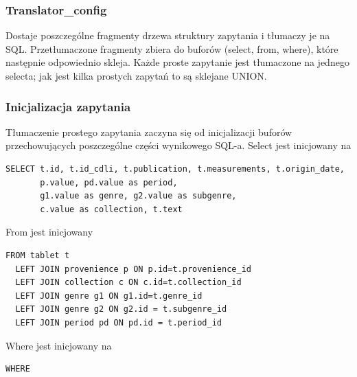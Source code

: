 \documentclass{pracamgr}
\begin{document}
 

\subsubsection{Translator\_config}
Dostaje poszczególne fragmenty drzewa struktury zapytania i tłumaczy je na SQL. Przetłumaczone fragmenty zbiera do buforów (select, from, where), które następnie odpowiednio skleja.
Każde proste zapytanie jest tłumaczone na jednego selecta; jak jest kilka prostych zapytań to są sklejane UNION.

\subsubsection{Inicjalizacja zapytania}
Tłumaczenie prostego zapytania zaczyna się od inicjalizacji buforów przechowujących poszczególne części wynikowego SQL-a.
Select jest inicjowany na 
\begin{verbatim}
SELECT t.id, t.id_cdli, t.publication, t.measurements, t.origin_date, 
       p.value, pd.value as period,
       g1.value as genre, g2.value as subgenre, 
       c.value as collection, t.text
\end{verbatim}
From jest inicjowany
\begin{verbatim}
FROM tablet t
  LEFT JOIN provenience p ON p.id=t.provenience_id
  LEFT JOIN collection c ON c.id=t.collection_id
  LEFT JOIN genre g1 ON g1.id=t.genre_id
  LEFT JOIN genre g2 ON g2.id = t.subgenre_id
  LEFT JOIN period pd ON pd.id = t.period_id
\end{verbatim}
Where jest inicjowany na
\begin{verbatim}
WHERE
\end{verbatim}
\end{document}
